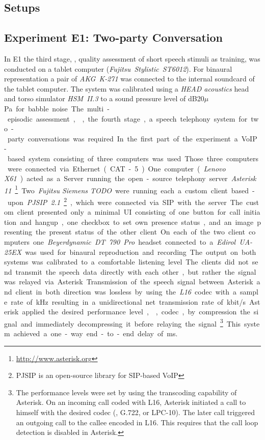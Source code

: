 \subsection{Setups}\label{appendix:laboratorySetups}

\subsection{Experiment E1: Two-party Conversation}
In E1 the third stage, \ie, quality assessment of short speech stimuli as training, was conducted on a tablet computer (\emph{Fujitsu~Stylistic~ST6012}).
For binaural representation a pair of \emph{AKG~K-271} was connected to the internal soundcard of the tablet computer.
The system was calibrated using a \emph{HEAD acoustics} head and torso simulator \emph{HSM~II.3} to a sound pressure level of \unit[75]{dB20$\mu$Pa} for babble noise.

The multi-episodic assessment, \ie, the fourth stage, a speech telephony system for two-party conversations was required.
In the first part of the experiment a \ac{VoIP}-based system consisting of three computers was used.
Those three computers were connected via Ethernet (CAT-5). 
One computer (\emph{Lenovo X61}) acted as a Server running the open-source telephony server \emph{Asterisk 11}\footnote{\url{http://www.asterisk.org}}.
Two \emph{Fujitsu Siemens TODO} were running each a custom client based-upon \emph{PJSIP~2.1}\footnote{PJSIP is an open-source library for \ac{SIP}-based \ac{VoIP}}, which were connected via \ac{SIP} with the server.
The custom client presented only a minimal \ac{UI} consisting of one button for call initiation and hangup, one checkbox to set own presence status, and an image presenting the present status of the other client.
On each of the two client computers one \emph{Beyerdynamic~DT~790~Pro} headset connected to a \emph{Edirol~UA-25EX} was used for binaural reproduction and recording.
The output on both systems was calibrated to a comfortable listening level. %
The clients did not send transmit the speech data directly with each other, but rather the signal was relayed via Asterisk.
Transmission of the speech signal between Asterisk and client in both direction was lossless by using the \emph{L16} codec with a sample rate of \unit[16]{kHz} resulting in a unidirectional net transmission rate of \unit[256]{kbit/s}. %
Asterisk applied the desired performance level, \ie, codec, by compression the signal and immediately decompressing it before relaying the signal.\footnote{The performance levels were set by using the transcoding capability of Asterisk. On an incoming call coded with L16, Asterisk initiated a call to himself with the desired codec (\ie, G.722, or LPC-10). The later call triggered an outgoing call to the callee encoded in L16. This requires that the call loop detection is disabled in Asterisk.}
This system achieved a one-way end-to-end delay of \unit[120]{ms}.

